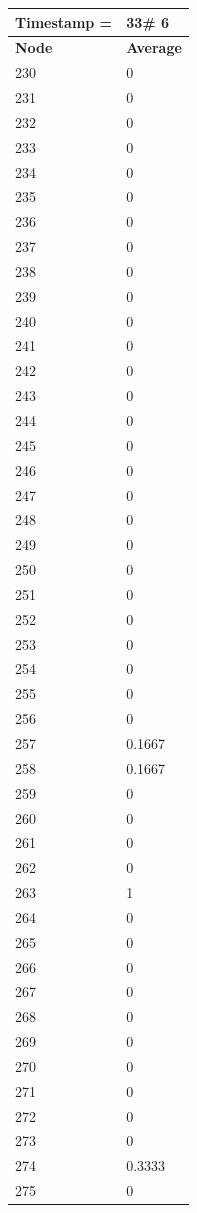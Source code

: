 \begin{tabular}{|l||l|}
\hline
\textbf{Timestamp =} & \textbf{33}\# 6\\\hline
	\textbf{Node} & \textbf{Average} \\ \hline
\hline
	230 & 0 \\ \hline
	231 & 0 \\ \hline
	232 & 0 \\ \hline
	233 & 0 \\ \hline
	234 & 0 \\ \hline
	235 & 0 \\ \hline
	236 & 0 \\ \hline
	237 & 0 \\ \hline
	238 & 0 \\ \hline
	239 & 0 \\ \hline
	240 & 0 \\ \hline
	241 & 0 \\ \hline
	242 & 0 \\ \hline
	243 & 0 \\ \hline
	244 & 0 \\ \hline
	245 & 0 \\ \hline
	246 & 0 \\ \hline
	247 & 0 \\ \hline
	248 & 0 \\ \hline
	249 & 0 \\ \hline
	250 & 0 \\ \hline
	251 & 0 \\ \hline
	252 & 0 \\ \hline
	253 & 0 \\ \hline
	254 & 0 \\ \hline
	255 & 0 \\ \hline
	256 & 0 \\ \hline
	257 & 0.1667 \\ \hline
	258 & 0.1667 \\ \hline
	259 & 0 \\ \hline
	260 & 0 \\ \hline
	261 & 0 \\ \hline
	262 & 0 \\ \hline
	263 & 1 \\ \hline
	264 & 0 \\ \hline
	265 & 0 \\ \hline
	266 & 0 \\ \hline
	267 & 0 \\ \hline
	268 & 0 \\ \hline
	269 & 0 \\ \hline
	270 & 0 \\ \hline
	271 & 0 \\ \hline
	272 & 0 \\ \hline
	273 & 0 \\ \hline
	274 & 0.3333 \\ \hline
	275 & 0 \\ \hline
\end{tabular}

